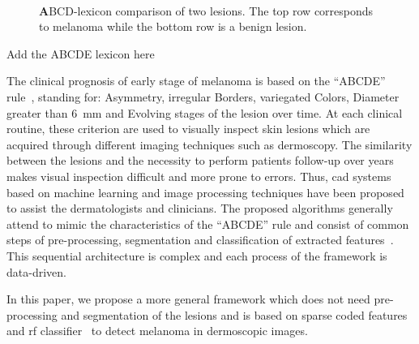 \begin{figure}
\begin{center}
    \hfill
    \hfill
    \hfill
  \hspace*{\fill}\\
    \caption{{\textbf ABCD}-lexicon comparison of two lesions. The top row corresponds to melanoma while the bottom row is a benign lesion.}
  \label{fig:lexicon}
\end{center}
\end{figure}
{\color{red}Add the ABCDE lexicon here}

The clinical prognosis of early stage of melanoma is based on the ``ABCDE'' rule~\cite{abbasi2004early}, standing for: Asymmetry, irregular Borders, variegated Colors, Diameter greater than \SI{6}{\milli \meter} and Evolving stages of the lesion over time.
At each clinical routine, these criterion are used to visually inspect skin lesions which are acquired through different imaging techniques such as dermoscopy.
The similarity between the lesions and the necessity to perform patients follow-up over years makes visual inspection difficult and more prone to errors.
Thus, \ac{cad} systems based on machine learning and image processing techniques have been proposed to assist the dermatologists and clinicians. 
The proposed algorithms generally attend to mimic the characteristics of the ``ABCDE'' rule and consist of common steps of pre-processing, segmentation and classification of extracted features~\cite{rastgoo2015automatic}.
This sequential architecture is complex and each process of the framework is data-driven. 

In this paper, we propose a more general framework which does not need pre-processing and segmentation of the lesions and is based on sparse coded features and \ac{rf} classifier~\cite{breiman2001random} to detect melanoma in dermoscopic images. 

